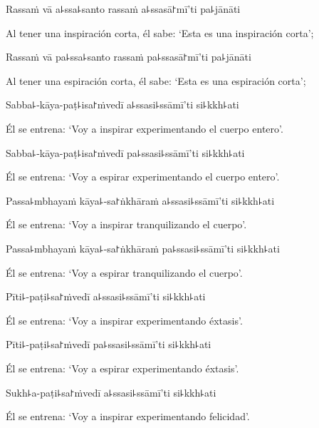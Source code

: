 Rassaṁ vā a꜕ssa꜕santo rassaṁ a꜕ssasā꜓mī'ti pa꜕jānāti

\begin{english}
  Al tener una inspiración corta, él sabe: ‘Esta es una inspiración corta’;
\end{english}

Rassaṁ vā pa꜕ssa꜕santo rassaṁ pa꜕ssasā꜓mī'ti pa꜕jānāti

\begin{english}
  Al tener una espiración corta, él sabe: ‘Esta es una espiración corta’;
\end{english}

Sabba꜕-kāya-paṭ꜕isa꜓ṁvedī a꜕ssasi꜕ssāmī'ti si꜕kkh꜕ati

\begin{english}
  Él se entrena: ‘Voy a inspirar experimentando el cuerpo entero’.
\end{english}

Sabba꜕-kāya-paṭ꜕isa꜓ṁvedī pa꜕ssasi꜕ssāmī'ti si꜕kkh꜕ati

\begin{english}
  Él se entrena: ‘Voy a espirar experimentando el cuerpo entero’.
\end{english}

Passa꜕mbhayaṁ kāya꜕-sa꜓ṅkhāraṁ a꜕ssasi꜕ssāmī'ti si꜕kkh꜕ati

\begin{english}
  Él se entrena: ‘Voy a inspirar tranquilizando el cuerpo’.
\end{english}

Passa꜕mbhayaṁ kāya꜕-sa꜓ṅkhāraṁ pa꜕ssasi꜕ssāmī'ti si꜕kkh꜕ati

\begin{english}
  Él se entrena: ‘Voy a espirar tranquilizando el cuerpo’.
\end{english}

Pīti꜕-paṭi꜕sa꜓ṁvedī a꜕ssasi꜕ssāmī'ti si꜕kkh꜕ati

\begin{english}
  Él se entrena: ‘Voy a inspirar experimentando éxtasis’.
\end{english}

Pīti꜕-paṭi꜕sa꜓ṁvedī pa꜕ssasi꜕ssāmī'ti si꜕kkh꜕ati

\begin{english}
  Él se entrena: ‘Voy a espirar experimentando éxtasis’.
\end{english}

Sukh꜕a-paṭi꜕sa꜓ṁvedī a꜕ssasi꜕ssāmī'ti si꜕kkh꜕ati

\begin{english}
  Él se entrena: ‘Voy a inspirar experimentando felicidad’.
\end{english}

